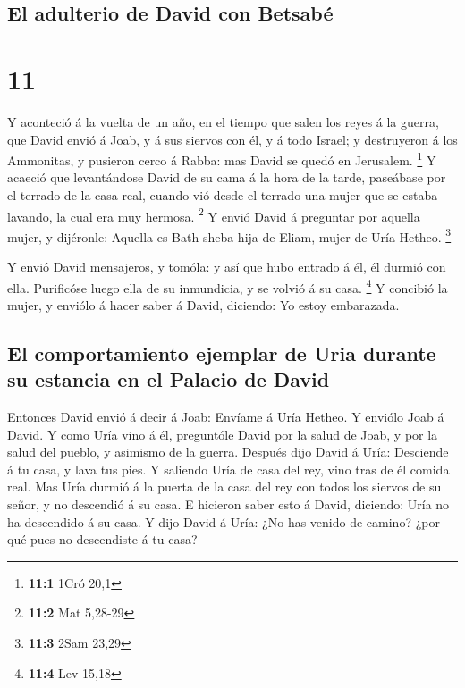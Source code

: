 \hypertarget{el-adulterio-de-david-con-betsabuxe9}{%
\subsection{El adulterio de David con
Betsabé}\label{el-adulterio-de-david-con-betsabuxe9}}

\hypertarget{section-10}{%
\section{11}\label{section-10}}

 Y aconteció á la vuelta de un año, en el tiempo que salen
los reyes á la guerra, que David envió á Joab, y á sus siervos con él, y
á todo Israel; y destruyeron á los Ammonitas, y pusieron cerco á Rabba:
mas David se quedó en Jerusalem. \footnote{\textbf{11:1} 1Cró 20,1}
 Y acaeció que levantándose David de su cama á la hora de la
tarde, paseábase por el terrado de la casa real, cuando vió desde el
terrado una mujer que se estaba lavando, la cual era muy hermosa.
\footnote{\textbf{11:2} Mat 5,28-29}  Y envió David á
preguntar por aquella mujer, y dijéronle: Aquella es Bath-sheba hija de
Eliam, mujer de Uría Hetheo. \footnote{\textbf{11:3} 2Sam 23,29}

 Y envió David mensajeros, y tomóla: y así que hubo entrado
á él, él durmió con ella. Purificóse luego ella de su inmundicia, y se
volvió á su casa. \footnote{\textbf{11:4} Lev 15,18}  Y
concibió la mujer, y enviólo á hacer saber á David, diciendo: Yo estoy
embarazada.

\hypertarget{el-comportamiento-ejemplar-de-uria-durante-su-estancia-en-el-palacio-de-david}{%
\subsection{El comportamiento ejemplar de Uria durante su estancia en el
Palacio de
David}\label{el-comportamiento-ejemplar-de-uria-durante-su-estancia-en-el-palacio-de-david}}

 Entonces David envió á decir á Joab: Envíame á Uría Hetheo.
Y enviólo Joab á David.  Y como Uría vino á él, preguntóle
David por la salud de Joab, y por la salud del pueblo, y asimismo de la
guerra.  Después dijo David á Uría: Desciende á tu casa, y
lava tus pies. Y saliendo Uría de casa del rey, vino tras de él comida
real.  Mas Uría durmió á la puerta de la casa del rey con
todos los siervos de su señor, y no descendió á su casa.  E
hicieron saber esto á David, diciendo: Uría no ha descendido á su casa.
Y dijo David á Uría: ¿No has venido de camino? ¿por qué pues no
descendiste á tu casa?

